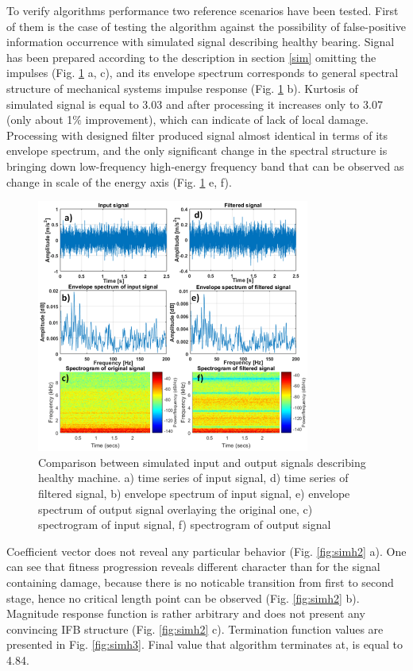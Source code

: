 \documentclass[preprint,12pt]{elsarticle}
\begin{document}
To verify algorithms performance two reference scenarios have been tested. First of them is the case of testing the algorithm against the possibility of false-positive information occurrence with simulated signal describing healthy bearing. Signal has been prepared according to the description in section \ref{sim} omitting the impulses (Fig. \ref{fig:simh1} a, c), and its envelope spectrum corresponds to general spectral structure of mechanical systems impulse response (Fig. \ref{fig:simh1} b). Kurtosis of simulated signal is equal to 3.03 and after processing it increases only to 3.07 (only about 1$\%$ improvement), which can indicate of lack of local damage. Processing with designed filter produced signal almost identical in terms of its envelope spectrum, and the only significant change in the spectral structure is bringing down low-frequency high-energy frequency band that can be observed as change in scale of the energy axis (Fig. \ref{fig:simh1} e, f). 

\begin{figure}[ht!]
\centering
\includegraphics[width=0.8\textwidth]{wykresy/simh1.png}
\caption{Comparison between simulated input and output signals describing healthy machine. a) time series of input signal, d) time series of filtered signal, b) envelope spectrum of input signal, e) envelope spectrum of output signal overlaying the original one, c) spectrogram of input signal, f) spectrogram of output signal}
\label{fig:simh1}
\end{figure}

Coefficient vector does not reveal any particular behavior (Fig. \ref{fig:simh2} a). One can see that fitness progression reveals different character than for the signal containing damage, because there is no noticable transition from first to second stage, hence no critical length point can be observed (Fig. \ref{fig:simh2} b). Magnitude response function is rather arbitrary and does not present any convincing IFB structure (Fig. \ref{fig:simh2} c). Termination function values are presented in Fig. \ref{fig:simh3}. Final value that algorithm terminates at, is equal to 4.84.
\end{document}
